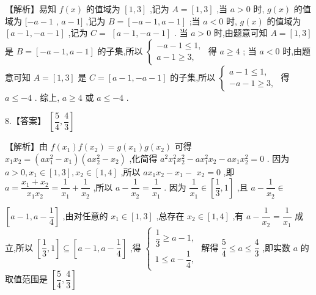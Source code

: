 \documentclass[10pt]{article}
\begin{document}
【解析】易知 $f\left( x\right)$ 的值域为 $\left\lbrack  {1,3}\right\rbrack$ ,记为 $A = \left\lbrack  {1,3}\right\rbrack$ ,当 $a > 0$ 时, $g\left( x\right)$ 的值域为 $\lbrack  - a - 1$ , $a - 1\rbrack$ ,记为 $B = \left\lbrack  {-a - 1,a - 1}\right\rbrack$ ;当 $a < 0$ 时, $g\left( x\right)$ 的值域为 $\left\lbrack  {a - 1, - a - 1}\right\rbrack$ ,记为 $C =$  $\left\lbrack  {a - 1, - a - 1}\right\rbrack$ . 当 $a > 0$ 时,由题意可知 $A = \left\lbrack  {1,3}\right\rbrack$ 是 $B = \left\lbrack  {-a - 1,a - 1}\right\rbrack$ 的子集,所以 $\left\{  \begin{array}{l}  - a - 1 \leq  1, \\  a - 1 \geq  3, \end{array}\right.$ 得 $a \geq  4$ ; 当 $a < 0$ 时,由题意可知 $A = \left\lbrack  {1,3}\right\rbrack$ 是 $C = \left\lbrack  {a - 1, - a - 1}\right\rbrack$ 的子集,所以 $\left\{  \begin{array}{l} a - 1 \leq  1, \\   - a - 1 \geq  3, \end{array}\right.$ 得 $a \leq   - 4$ . 综上, $a \geq  4$ 或 $a \leq   - 4$ .

8.【答案】 $\left\lbrack  {\dfrac{5}{4},\dfrac{4}{3}}\right\rbrack$

【解析】由 $f\left( {x}_{1}\right) f\left( {x}_{2}\right)  = g\left( {x}_{1}\right) g\left( {x}_{2}\right)$ 可得 ${x}_{1}{x}_{2} = \left( {a{x}_{1}^{2} - {x}_{1}}\right) \left( {a{x}_{2}^{2} - {x}_{2}}\right)$ ,化简得 ${a}^{2}{x}_{1}^{2}{x}_{2}^{2} - a{x}_{1}^{2}{x}_{2} - a{x}_{1}{x}_{2}^{2} = 0$ . 因为 $a > 0,{x}_{1} \in  \left\lbrack  {1,3}\right\rbrack  ,{x}_{2} \in  \left\lbrack  {1,4}\right\rbrack$ ,所以 $a{x}_{1}{x}_{2} - {x}_{1} -$  ${x}_{2} = 0$ ,即 $a = \dfrac{{x}_{1} + {x}_{2}}{{x}_{1}{x}_{2}} = \dfrac{1}{{x}_{1}} + \dfrac{1}{{x}_{2}}$ ,所以 $a - \dfrac{1}{{x}_{2}} = \dfrac{1}{{x}_{1}}$ . 因为 $\dfrac{1}{{x}_{1}} \in  \left\lbrack  {\dfrac{1}{3},1}\right\rbrack$ ,且 $a - \dfrac{1}{{x}_{2}} \in$

$\left\lbrack  {a - 1,a - \dfrac{1}{4}}\right\rbrack$ ,由对任意的 ${x}_{1} \in  \left\lbrack  {1,3}\right\rbrack$ ,总存在 ${x}_{2} \in  \left\lbrack  {1,4}\right\rbrack$ ,有 $a - \dfrac{1}{{x}_{2}} = \dfrac{1}{{x}_{1}}$ 成立,所以 $\left\lbrack  {\dfrac{1}{3},1}\right\rbrack   \subseteq  \left\lbrack  {a - 1,a - \dfrac{1}{4}}\right\rbrack$ ,得 $\left\{  \begin{array}{l} \dfrac{1}{3} \geq  a - 1, \\  1 \leq  a - \dfrac{1}{4}, \end{array}\right.$ 解得 $\dfrac{5}{4} \leq  a \leq  \dfrac{4}{3}$ ,即实数 $a$ 的取值范围是 $\left\lbrack  {\dfrac{5}{4},\dfrac{4}{3}}\right\rbrack$
\end{document}
